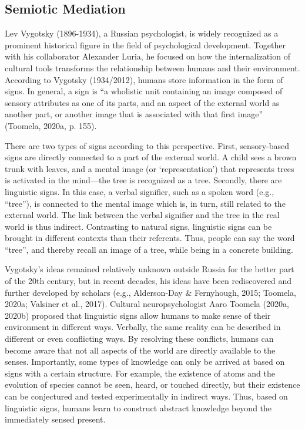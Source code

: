 \documentclass[authordate, empirical]{jote-new-article}
\begin{document}
	\subsection{Semiotic Mediation}



	Lev Vygotsky (1896-1934), a Russian psychologist, is widely recognized as a prominent historical figure in the field of psychological development. Together with his collaborator Alexander Luria, he focused on how the internalization of cultural tools transforms the relationship between humans and their environment. According to Vygotsky (1934/2012), humans store information in the form of signs. In general, a sign is “a wholistic unit containing an image composed of sensory attributes as one of its parts, and an aspect of the external world as another part, or another image that is associated with that first image” (Toomela, 2020a, p. 155).



	There are two types of signs according to this perspective. First, sensory-based signs are directly connected to a part of the external world. A child sees a brown trunk with leaves, and a mental image (or ‘representation') that represents trees is activated in the mind—the tree is recognized as a tree. Secondly, there are linguistic signs. In this case, a verbal signifier, such as a spoken word (e.g., “tree”), is connected to the mental image which is, in turn, still related to the external world. The link between the verbal signifier and the tree in the real world is thus indirect. Contrasting to natural signs, linguistic signs can be brought in different contexts than their referents. Thus, people can say the word “tree”, and thereby recall an image of a tree, while being in a concrete building.



	Vygotsky's ideas remained relatively unknown outside Russia for the better part of the 20th century, but in recent decades, his ideas have been rediscovered and further developed by scholars (e.g., Alderson-Day \& Fernyhough, 2015; Toomela, 2020a; Valsiner et al., 2017). Cultural neuropsychologist Aaro Toomela (2020a, 2020b) proposed that linguistic signs allow humans to make sense of their environment in different ways. Verbally, the same reality can be described in different or even conflicting ways. By resolving these conflicts, humans can become aware that not all aspects of the world are directly available to the senses. Importantly, some types of knowledge can only be arrived at based on signs with a certain structure. For example, the existence of atoms and the evolution of species cannot be seen, heard, or touched directly, but their existence can be conjectured and tested experimentally in indirect ways. Thus, based on linguistic signs, humans learn to construct abstract knowledge beyond the immediately sensed present.
\end{document}
